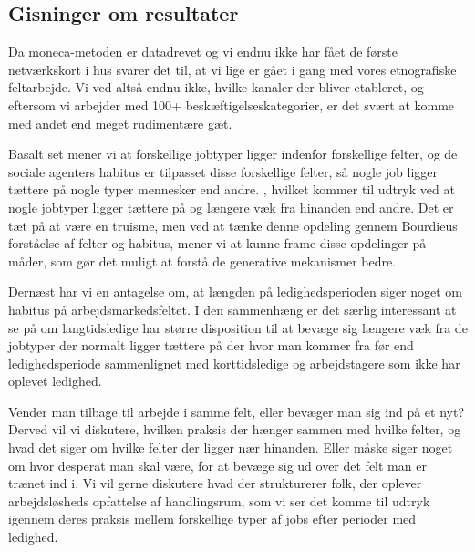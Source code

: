 \subsection{Gisninger om resultater} %

Da moneca-metoden er datadrevet og vi endnu ikke har fået de første netværkskort i hus svarer det til, at vi lige er gået i gang med vores etnografiske feltarbejde. Vi ved altså endnu ikke, hvilke kanaler der bliver etableret, og eftersom vi arbejder med 100+ beskæftigelseskategorier, er det svært at komme med andet end meget rudimentære gæt.

Basalt set mener vi at forskellige jobtyper ligger indenfor forskellige felter, og de sociale agenters habitus er tilpasset disse forskellige felter, så nogle job ligger tættere på nogle typer mennesker end andre. , hvilket kommer til udtryk ved at nogle jobtyper ligger tættere på og længere væk fra hinanden end andre. Det er tæt på at være en truisme, men ved at tænke denne opdeling gennem Bourdieus forståelse af felter og habitus, mener vi at kunne frame disse opdelinger på måder, som gør det muligt at forstå de generative mekanismer bedre. 

Dernæst har vi en antagelse om, at længden på ledighedsperioden siger noget om habitus på arbejdsmarkedsfeltet. I den sammenhæng er det særlig interessant at se på om langtidsledige har større disposition til at bevæge sig længere væk fra de jobtyper der normalt ligger tættere på der hvor man kommer fra før end ledighedsperiode sammenlignet med korttidsledige og arbejdstagere som ikke har oplevet ledighed.

Vender man tilbage til arbejde i samme felt, eller bevæger man sig ind på et nyt? Derved vil vi diskutere, hvilken praksis der hænger sammen med hvilke felter, og hvad det siger om hvilke felter der ligger nær hinanden. Eller måske siger noget om hvor desperat man skal være, for at bevæge sig ud over det felt man er trænet ind i. Vi vil gerne diskutere hvad der strukturerer folk, der oplever arbejdsløsheds opfattelse af handlingsrum, som vi ser det komme til udtryk igennem deres praksis mellem forskellige typer af jobs efter perioder med ledighed.


